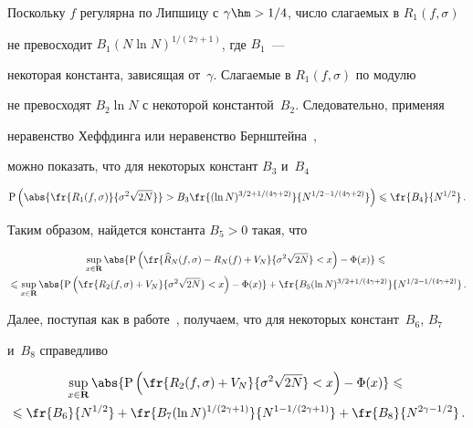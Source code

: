 Поскольку $f$ регулярна по Липшицу с $\gamma\hm>1/4$, число слагаемых в $R_1(f,\sigma)$ 

не превосходит $B_1 (N\ln N)^{{1}/(2\gamma+1)}$, где $B_1$~--- 

некоторая константа, зависящая от~$\gamma$. Слагаемые в $R_1(f,\sigma)$ по модулю 

не превосходят $B_2\ln N$ с некоторой константой~$B_2$. Следовательно, применяя 

неравенство Хеффдинга или неравенство Бернштейна~\cite{13sh}, 

можно показать, что для некоторых констант $B_3$ и~$B_4$

$$

\mathrm{P}\left(\abs{\fr{R_1(f,\sigma)}{\sigma^2\sqrt{2N}}}>B_3\fr{(\ln N)^{{3}/{2}+1/(4\gamma+2)}}

{N^{1/2-1/(4\gamma+2)}}\right)\leqslant\fr{B_4}{N^{1/2}}\,.

$$

Таким образом, найдется константа $B_5>0$ такая, что

\begin{multline}

\sup\limits_{x\in\mathbf{R}}\abs{\mathrm{P}\left(

\fr{\widehat{R}_N(f,\sigma)-R_N(f)+V_N}{\sigma^2\sqrt{2N}}<x\right)-\Phi(x)}\leqslant{}\\

{}\leqslant\sup\limits_{x\in\mathbf{R}}\abs{\mathrm{P}\left(

\fr{R_2(f,\sigma)+V_N}{\sigma^2\sqrt{2N}}<x\right)-\Phi(x)}+

\fr{B_5(\ln N)^{3/2+1/(4\gamma+2)}}{N^{1/2-1/(4\gamma+2)}}\,.\label{e10sh}

\end{multline}



Далее, поступая как в работе~\cite{8sh}, получаем, что для некоторых констант~$B_6$, $B_7$ 

и~$B_8$ справедливо

\begin{multline}

\sup\limits_{x\in\mathbf{R}}\abs{\mathrm{P}\left(

\fr{R_2(f,\sigma)+V_N}{\sigma^2\sqrt{2N}}<x\right)-\Phi(x)}\leqslant{}\\

{}\leqslant

\fr{B_6}{N^{1/2}}+\fr{B_7(\ln N)^{1/(2\gamma+1)}}{N^{1-1/(2\gamma+1)}}+

\fr{B_8}{N^{2\gamma-1/2}}\,.\label{e11sh}

\end{multline}



